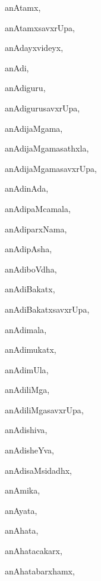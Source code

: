 \begin{multicols}{3}
{\noindent
{anAtamx}, \pageref{anAtamx}

\noindent
{anAtamxsavxrUpa}, \pageref{anAtamxsavxrUpa}

\noindent
{anAdayxvideyx}, \pageref{anAdayxvideyx}

\noindent
{anAdi}, \pageref{anAdi}

\noindent
{anAdiguru}, \pageref{anAdiguru}

\noindent
{anAdigurusavxrUpa}, \pageref{anAdigurusavxrUpa}

\noindent
{anAdijaMgama}, \pageref{anAdijaMgama}

\noindent
{anAdijaMgamasathxla}, \pageref{anAdijaMgamasathxla}

\noindent
{anAdijaMgamasavxrUpa}, \pageref{anAdijaMgamasavxrUpa}

\noindent
{anAdinAda}, \pageref{anAdinAda}

\noindent
{anAdipaMcamala}, \pageref{anAdipaMcamala}

\noindent
{anAdiparxNama}, \pageref{anAdiparxNama}

\noindent
{anAdipAsha}, \pageref{anAdipAsha}

\noindent
{anAdiboVdha}, \pageref{anAdiboVdha}

\noindent
{anAdiBakatx}, \pageref{anAdiBakatx}

\noindent
{anAdiBakatxsavxrUpa}, \pageref{anAdiBakatxsavxrUpa}

\noindent
{anAdimala}, \pageref{anAdimala}

\noindent
{anAdimukatx}, \pageref{anAdimukatx}

\noindent
{anAdimUla}, \pageref{anAdimUla}

\noindent
{anAdiliMga}, \pageref{anAdiliMga}

\noindent
{anAdiliMgasavxrUpa}, \pageref{anAdiliMgasavxrUpa}

\noindent
{anAdishiva}, \pageref{anAdishiva}

\noindent
{anAdisheYva}, \pageref{anAdisheYva}

\noindent
{anAdisaMsidadhx}, \pageref{anAdisaMsidadhx}

\noindent
{anAmika}, \pageref{anAmika}

\noindent
{anAyata}, \pageref{anAyata}

\noindent
{anAhata}, \pageref{anAhata}

\noindent
{anAhatacakarx}, \pageref{anAhatacakarx}

\noindent
{anAhatabarxhamx}, \pageref{anAhatabarxhamx}

}
\end{multicols}
